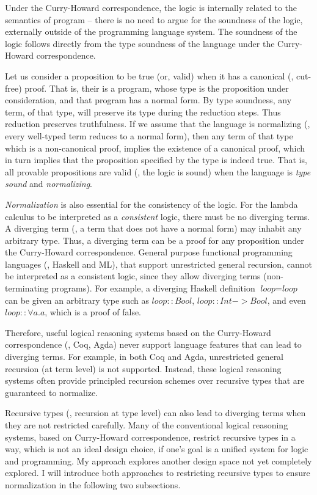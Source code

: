 Under the Curry-Howard correspondence, the logic is internally related to the
semantics of program -- there is no need to argue for the soundness of the
logic,  externally outside of the programming language system. The soundness
of the logic follows directly from the type soundness of the language under
the Curry-Howard correspondence.

Let us consider a proposition to be true
(or, valid) when it has a canonical (\ie, cut-free) proof.
That is, their is a program, whose type is the proposition under
consideration, and that program has a normal form. 
By type soundness, any term,
of that type, will preserve its type during the reduction steps. Thus
reduction preserves truthfulness. If we assume
that the language is normalizing (\ie, every well-typed term reduces to
a normal form), then any term of that type which is a non-canonical proof,
implies the existence of a canonical proof, which in turn implies that
the proposition specified by the type is indeed true. That is, all provable
propositions are valid (\ie, the logic is sound) when the language is
\emph{type sound} and \emph{normalizing}.

\emph{Normalization} is also essential for the consistency of the logic.
For the lambda calculus to be interpreted as a \emph{consistent} logic,
there must be no diverging terms. A diverging term (\ie, a term that does
not have a normal form) may inhabit any arbitrary type. Thus, a diverging term
can be a proof for any proposition under the Curry-Howard correspondence.
General purpose functional programming languages (\eg, Haskell and ML), that
support unrestricted general recursion, cannot be interpreted as a consistent
logic, since they allow diverging terms (non-terminating programs).
For example, a diverging Haskell definition $\textit{loop} = \textit{loop}$
can be given an arbitrary type such as
$\textit{loop}\mathrel{::}\textit{Bool}$,
$\textit{loop}\mathrel{::}\textit{Int} -> \textit{Bool}$,
and even $\textit{loop}\mathrel{::}\forall a. a$, which is a proof of false.


Therefore, useful logical reasoning systems based on the Curry-Howard
correspondence (\eg, Coq, Agda) never support language features that can
lead to diverging terms. For example, in both Coq and Agda,
unrestricted general recursion (at term level) is not supported. 
Instead, these logical reasoning systems
often provide principled recursion schemes over recursive types that are
guaranteed to normalize. 

Recursive types (\ie, recursion at type level)
can also lead to diverging terms when they are not restricted carefully.
Many of the conventional logical reasoning systems, based on
Curry-Howard correspondence, restrict recursive types in a way,
which is not an ideal design choice, if one's goal is a unified system for
logic and programming. My approach explores another design space not yet
completely explored. I will introduce both approaches to restricting recursive
types to ensure normalization in the following two subsections.

